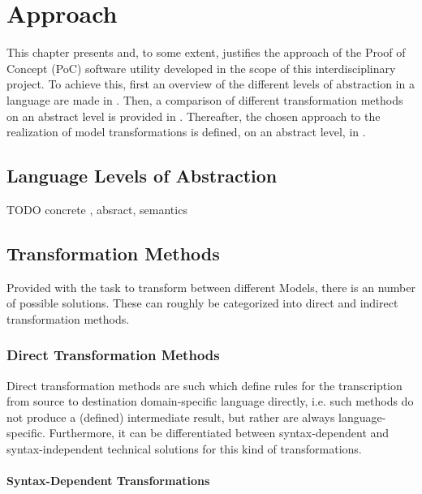 \chapter{Approach}
\label{chap:approach}

This chapter presents and, to some extent, justifies the approach of the Proof of Concept (PoC) software utility developed in the scope of this interdisciplinary project. To achieve this, first an overview of the different levels of abstraction in a language are made in . Then, a comparison of different transformation methods on an abstract level is provided in . Thereafter, the chosen approach to the realization of model transformations is defined, on an abstract level, in .

\section{Language Levels of Abstraction}
\label{sec:approach:abstraction}

\color{red}TODO concrete , absract, semantics\color{black}

\section{Transformation Methods}
\label{sec:approach:transform}

Provided with the task to transform between different Models, there is an number of possible solutions. These can roughly be categorized into direct and indirect transformation methods.

\subsection{Direct Transformation Methods}

Direct transformation methods are such which define rules for the transcription from source to destination domain-specific language directly, i.e. such methods do not produce a (defined) intermediate result, but rather are always language-specific. Furthermore, it can be differentiated between syntax-dependent and syntax-independent technical solutions for this kind of transformations.

\subsubsection{Syntax-Dependent Transformations}

